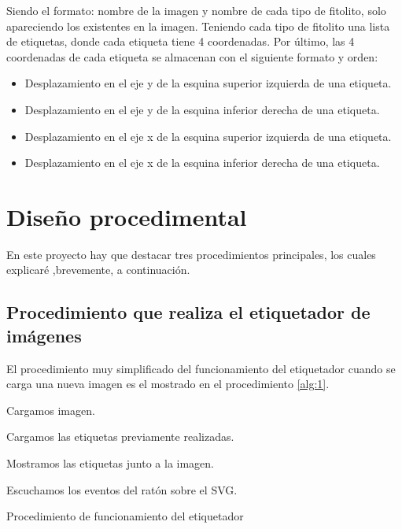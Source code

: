 Siendo el formato: nombre de la imagen y nombre de cada tipo de fitolito, solo apareciendo los existentes en la imagen. Teniendo cada tipo de fitolito una lista de etiquetas, donde cada etiqueta tiene 4 coordenadas. Por último, las 4 coordenadas de cada etiqueta se almacenan con el siguiente formato y orden:

\begin{itemize}
	\item Desplazamiento en el eje y de la esquina superior izquierda de una etiqueta.
	\item  Desplazamiento en el eje y de la esquina inferior derecha de una etiqueta.
	\item Desplazamiento en el eje x de la esquina superior izquierda de una etiqueta.
	\item  Desplazamiento en el eje x de la esquina inferior derecha de una etiqueta.
\end{itemize}

\section{Diseño procedimental}

En este proyecto hay que destacar tres procedimientos principales, los cuales explicaré ,brevemente, a continuación.

\subsection{Procedimiento que realiza el etiquetador de imágenes}

El procedimiento muy simplificado del funcionamiento del etiquetador cuando se carga una nueva imagen es el mostrado en el procedimiento \ref{alg:1}.

\begin{algorithm}
    	{
    	Cargamos imagen.
    	
    		{
    			Cargamos las etiquetas previamente realizadas.
    			
    			Mostramos las etiquetas junto a la imagen.
    		}
    	Escuchamos los eventos del ratón sobre el SVG.
    	}
    \caption{Procedimiento de funcionamiento del etiquetador}
    \label{alg:1}
\end{algorithm}

